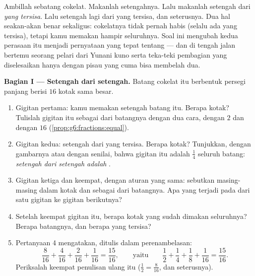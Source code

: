 \begin{problem}
\label{pb:g6:fractions:1}
Ambillah sebatang cokelat. Makanlah setengahnya. Lalu makanlah
setengah dari \emph{yang tersisa}. Lalu setengah lagi dari yang
tersisa, dan seterusnya. Dua hal seakan-akan benar sekaligus:
cokelatnya tidak pernah habis (selalu ada yang tersisa), tetapi kamu
memakan hampir seluruhnya. Soal ini mengubah kedua perasaan itu
menjadi pernyataan yang tepat tentang  --- dan di tengah jalan
bertemu seorang pelari dari Yunani kuno serta teka-teki pembagian yang
diselesaikan hanya dengan pisau yang cuma bisa membelah dua.

\medskip
\noindent\textbf{Bagian I --- Setengah dari setengah.}
Batang cokelat itu berbentuk persegi panjang berisi $16$ kotak sama besar.
\begin{enumerate}
  \item Gigitan pertama: kamu memakan setengah batang itu. Berapa
        kotak? Tulislah gigitan itu sebagai  dari batangnya
        dengan dua cara, dengan  $2$ dan dengan  $16$
        (\cref{prop:g6:fractions:equal}).
  \item Gigitan kedua: setengah dari yang tersisa. Berapa kotak?
        Tunjukkan, dengan gambarnya atau dengan  senilai, bahwa
        gigitan itu adalah $\frac14$ seluruh batang: \emph{setengah
        dari setengah adalah }.
  \item Gigitan ketiga dan keempat, dengan aturan yang sama: sebutkan
        masing-masing dalam kotak dan sebagai  dari batangnya.
        Apa yang terjadi pada  dari satu gigitan ke
        gigitan berikutnya?
  \item Setelah keempat gigitan itu, berapa kotak yang sudah dimakan
        seluruhnya? Berapa  batangnya, dan berapa  yang
        tersisa?
  \item Pertanyaan 4 mengatakan, ditulis dalam perenambelasan:
        \[
        \frac{8}{16} + \frac{4}{16} + \frac{2}{16} + \frac{1}{16}
        = \frac{15}{16},
        \qquad\text{yaitu}\qquad
        \frac12 + \frac14 + \frac18 + \frac{1}{16}
        = \frac{15}{16} .
        \]
        Periksalah keempat penulisan ulang itu
        ($\frac12 = \frac{8}{16}$, dan seterusnya).
\end{enumerate}


\end{problem}
